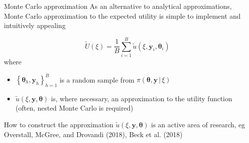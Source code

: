 \documentclass[
  ignorenonframetext,
]{beamer}
\providecommand{\tightlist}{%
  \setlength{\itemsep}{0pt}\setlength{\parskip}{0pt}}
\begin{document}
\begin{frame}{Monte Carlo approximation}
\protect\hypertarget{monte-carlo-approximation}{}
As an alternative to analytical approximations, Monte Carlo
approximation to the expected utility is simple to implement and
intuitively appealing

\[
\tilde{U}(\xi) = \frac{1}{B}\sum_{i=1}^B\tilde{u}(\xi, \boldsymbol{y}_i, \boldsymbol{\theta}_i)
\] where

\begin{itemize}
\tightlist
\item
  \(\left\{\boldsymbol{\theta}_h, \boldsymbol{y}_h\right\}_{h=1}^B\) is
  a random sample from
  \(\pi(\boldsymbol{\theta},\boldsymbol{y}\,|\,\xi)\)
\item
  \(\tilde{u}(\xi,\boldsymbol{y},\boldsymbol{\theta})\) is, where
  necessary, an approximation to the utility function (often, nested
  Monte Carlo is required)
\end{itemize}

How to construct the approximation
\(\tilde{u}(\xi,\boldsymbol{y},\boldsymbol{\theta})\) is an active area
of research, eg Overstall, McGree, and Drovandi (2018), Beck et al.
(2018)
\end{frame}
\end{document}
